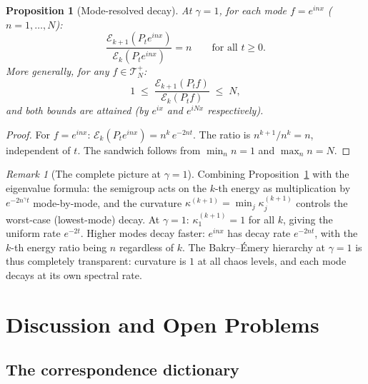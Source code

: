 \documentclass[11pt,a4paper]{article}
\theoremstyle{plain}
\newtheorem{proposition}[theorem]{Proposition}
\theoremstyle{definition}
\theoremstyle{remark}
\newtheorem{remark}[theorem]{Remark}
\begin{document}
\begin{proposition}[Mode-resolved decay]
\label{prop:mode-decay}
At $\gamma = 1$, for each mode $f = e^{inx}$
($n = 1,\ldots,N$):
\begin{equation}\label{eq:mode-decay}
  \frac{\mathcal{E}_{k+1}(P_t e^{inx})}
       {\mathcal{E}_k(P_t e^{inx})}
  = n \qquad \text{for all } t \geq 0.
\end{equation}
More generally, for any $f \in \mathcal{T}_N^+$:
\begin{equation}\label{eq:sandwich}
  1\;\leq\;
  \frac{\mathcal{E}_{k+1}(P_t f)}{\mathcal{E}_k(P_t f)}
  \;\leq\; N,
\end{equation}
and both bounds are attained (by $e^{ix}$ and $e^{iNx}$
respectively).
\end{proposition}

\begin{proof}
For $f = e^{inx}$:
$\mathcal{E}_k(P_t e^{inx}) = n^k\,e^{-2nt}$.
The ratio is $n^{k+1}/n^k = n$, independent of $t$.
The sandwich follows from
$\min_n n = 1$ and $\max_n n = N$.
\end{proof}

\begin{remark}[The complete picture at $\gamma = 1$]
\label{rem:complete}
Combining Proposition~\ref{prop:mode-decay} with the
eigenvalue formula: the semigroup acts on the $k$-th
energy as multiplication by $e^{-2n^\gamma t}$
mode-by-mode, and the curvature
$\kappa^{(k+1)} = \min_j \kappa_j^{(k+1)}$ controls the
worst-case (lowest-mode) decay.  At $\gamma = 1$:
$\kappa_1^{(k+1)} = 1$ for all $k$, giving the uniform
rate $e^{-2t}$.  Higher modes decay faster:
$e^{inx}$ has decay rate $e^{-2nt}$, with the $k$-th
energy ratio being $n$ regardless of $k$.
The Bakry--\'Emery hierarchy at $\gamma = 1$ is thus
completely transparent: curvature is $1$ at all
chaos levels, and each mode decays at its own
spectral rate.
\end{remark}


\section{Discussion and Open Problems}\label{sec:discussion}

\subsection{The correspondence dictionary}
\end{document}
